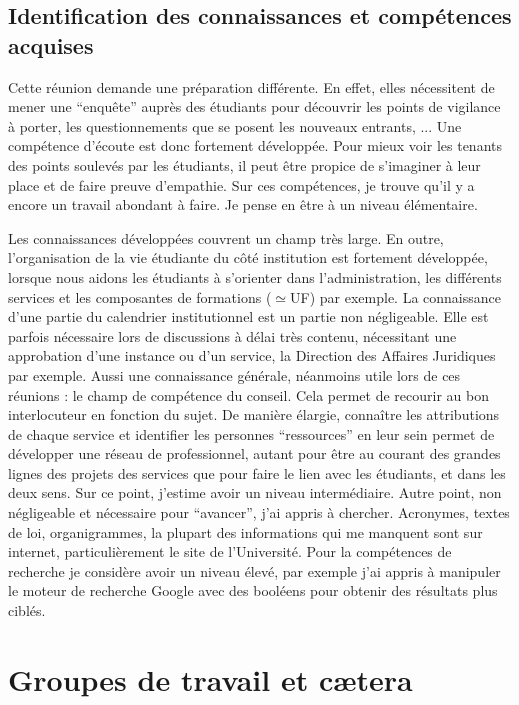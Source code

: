 \documentclass{article}
\begin{document}
\subsection{Identification des connaissances et compétences acquises}
Cette réunion demande une préparation différente. 
En effet, elles nécessitent de mener une ``enquête''  auprès des étudiants pour découvrir les points de vigilance à porter, les questionnements que se posent les nouveaux entrants, ... 
Une compétence d'écoute est donc fortement développée. 
Pour mieux voir les tenants des points soulevés par les étudiants, il peut être propice de s'imaginer à leur place et de faire preuve d'empathie. 
Sur ces compétences, je trouve qu'il y a encore un travail abondant à faire. 
Je pense en être à un niveau élémentaire. \par 
Les connaissances développées couvrent un champ très large. 
En outre, l'organisation de la vie étudiante du côté institution est fortement développée, lorsque nous aidons les étudiants à s'orienter dans l'administration, les différents services et les composantes de formations ($\simeq$UF) par exemple. 
La connaissance d'une partie du calendrier institutionnel est un partie non négligeable. 
Elle est parfois nécessaire lors de discussions à délai très contenu, nécessitant une approbation d'une instance ou d'un service, la Direction des Affaires Juridiques par exemple.
Aussi une connaissance générale, néanmoins utile lors de ces réunions : le champ de compétence du conseil. 
Cela permet de recourir au bon interlocuteur en fonction du sujet. 
De manière élargie, connaître les attributions de chaque service et identifier les personnes ``ressources'' en leur sein permet de développer une réseau de professionnel, autant pour être au courant des grandes lignes des projets des services que pour faire le lien avec les étudiants, et dans les deux sens. Sur ce point, j'estime avoir un niveau intermédiaire.
Autre point, non négligeable et nécessaire pour ``avancer'', j'ai appris à chercher. 
Acronymes, textes de loi, organigrammes, la plupart des informations qui me manquent sont sur internet, particulièrement le site de l'Université. 
Pour la compétences de recherche je considère avoir un niveau élevé, par exemple j'ai appris à manipuler le moteur de recherche Google avec des booléens pour obtenir des résultats plus ciblés.

\newpage

\section{Groupes de travail et cætera}
\end{document}

